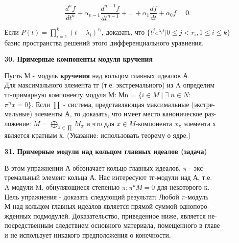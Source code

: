 \medskip

$$ \frac{d^{n}f}{dt^{n}}+\alpha_{n-1}\frac{d^{n-1}f}{dt^{n-1}}+...+\alpha_{1}\frac{df}{dt}+\alpha_{0}f = 0.$$

\medskip

Если $P(t) = \prod^k_{i=1}(t-\lambda_i)^{r_i}$, доказать, что $\{t^je^{\lambda_it}| 0 \leqslant j < r_i, 1 \leqslant i \leqslant k\} $\linebreak
- базис пространства решений этого дифференциального уравнения. 

\medskip

{\noindent\bf30. Примерные компоненты модуля кручения} 

\medskip

Пусть М - модуль \textbf{кручения} над кольцом главных идеалов А. \\
Для максимального элемента тг (т.е. экстремального) из A определим\\ 
тг-примарную компоненту модуля М: Мn = $\{i \in M \;|\; \exists\; n \in N :$\\ 
$\pi^nx = 0\}$. Если $\prod$ - система, представляющая максимальные 
(экстре-\\мальные) элементы А, то доказать, что имеет место каноническое 
раз-\\ложение: $ M = \bigoplus_{\pi\in\prod} M_{\pi} $ и что для $ x \in M $-компонента $x_\pi$ элемента х\\ 
является кратным х. (Указание: использовать теорему о ядре.)

\medskip

{\noindent\bf31. Примерные модули над кольцом главных идеалов (задача)}

\medskip

В этом упражнении А обозначает кольцо главных идеалов, $\pi$ - 
экс-\\тремальный элемент кольца А. Нас интересуют тг-модули над А, т.е.\\ 
A-модули M, обнуляющиеся степенью $\pi: \pi^kM = 0$ для некоторого к.\\ 
Цель упражнения - доказать следующий результат: Любой $\pi$-модуль\\ 
М над кольцом главных идеалов является прямой суммой однопоро-\\ 
жденных подмодулей. Доказательство, приведенное ниже, является 
не-\\посредственным следствием основного материала, помещенного в главе\\ 
и не использует никакого предположения о конечности. 

